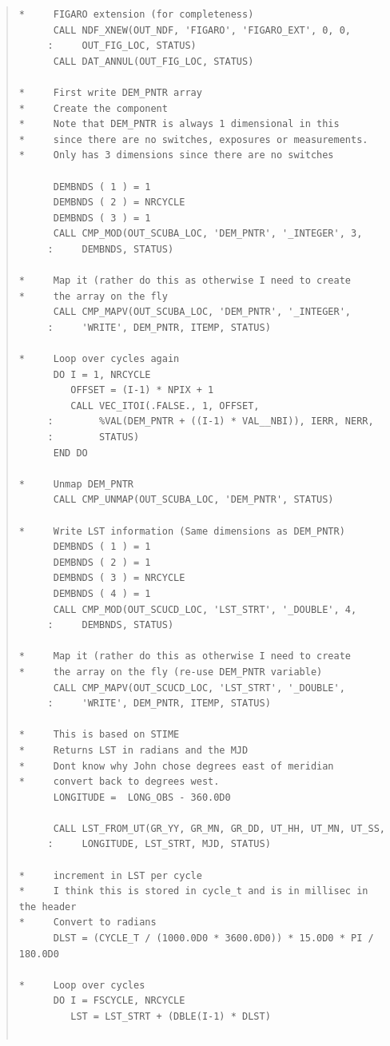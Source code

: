 \documentclass[twoside,11pt]{article}
\newenvironment{myquote}{\begin{quote}\begin{small}}{\end{small}\end{quote}}
\renewcommand{\_}{\texttt{\symbol{95}}}
\begin{document}
\begin{myquote}
\begin{verbatim}
*     FIGARO extension (for completeness)
      CALL NDF_XNEW(OUT_NDF, 'FIGARO', 'FIGARO_EXT', 0, 0,
     :     OUT_FIG_LOC, STATUS)
      CALL DAT_ANNUL(OUT_FIG_LOC, STATUS)

*     First write DEM_PNTR array
*     Create the component
*     Note that DEM_PNTR is always 1 dimensional in this
*     since there are no switches, exposures or measurements.
*     Only has 3 dimensions since there are no switches

      DEMBNDS ( 1 ) = 1
      DEMBNDS ( 2 ) = NRCYCLE
      DEMBNDS ( 3 ) = 1
      CALL CMP_MOD(OUT_SCUBA_LOC, 'DEM_PNTR', '_INTEGER', 3,
     :     DEMBNDS, STATUS)

*     Map it (rather do this as otherwise I need to create
*     the array on the fly
      CALL CMP_MAPV(OUT_SCUBA_LOC, 'DEM_PNTR', '_INTEGER',
     :     'WRITE', DEM_PNTR, ITEMP, STATUS)

*     Loop over cycles again
      DO I = 1, NRCYCLE
         OFFSET = (I-1) * NPIX + 1
         CALL VEC_ITOI(.FALSE., 1, OFFSET,
     :        %VAL(DEM_PNTR + ((I-1) * VAL__NBI)), IERR, NERR,
     :        STATUS)
      END DO

*     Unmap DEM_PNTR
      CALL CMP_UNMAP(OUT_SCUBA_LOC, 'DEM_PNTR', STATUS)

*     Write LST information (Same dimensions as DEM_PNTR)
      DEMBNDS ( 1 ) = 1
      DEMBNDS ( 2 ) = 1
      DEMBNDS ( 3 ) = NRCYCLE
      DEMBNDS ( 4 ) = 1
      CALL CMP_MOD(OUT_SCUCD_LOC, 'LST_STRT', '_DOUBLE', 4,
     :     DEMBNDS, STATUS)

*     Map it (rather do this as otherwise I need to create
*     the array on the fly (re-use DEM_PNTR variable)
      CALL CMP_MAPV(OUT_SCUCD_LOC, 'LST_STRT', '_DOUBLE',
     :     'WRITE', DEM_PNTR, ITEMP, STATUS)

*     This is based on STIME
*     Returns LST in radians and the MJD
*     Dont know why John chose degrees east of meridian
*     convert back to degrees west.
      LONGITUDE =  LONG_OBS - 360.0D0

      CALL LST_FROM_UT(GR_YY, GR_MN, GR_DD, UT_HH, UT_MN, UT_SS,
     :     LONGITUDE, LST_STRT, MJD, STATUS)

*     increment in LST per cycle
*     I think this is stored in cycle_t and is in millisec in the header
*     Convert to radians
      DLST = (CYCLE_T / (1000.0D0 * 3600.0D0)) * 15.0D0 * PI / 180.0D0

*     Loop over cycles
      DO I = FSCYCLE, NRCYCLE
         LST = LST_STRT + (DBLE(I-1) * DLST)
         

\end{verbatim}
\end{myquote}
\end{document}

